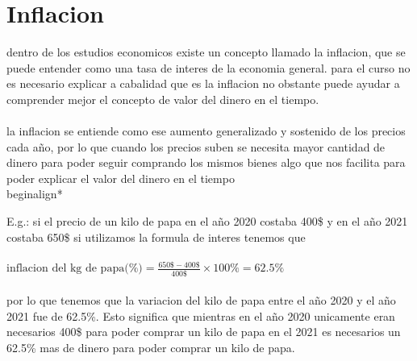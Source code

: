 \documentclass{article}
\begin{document}
\section{Inflacion}
\begin{flushleft}

dentro de los estudios economicos existe un concepto llamado la inflacion, que se puede entender 
como una tasa de interes de la economia general. para el curso no es necesario explicar a cabalidad que es la inflacion 
no obstante puede ayudar a comprender mejor el concepto de valor del dinero en el tiempo.\\~\\

la inflacion se entiende como ese aumento generalizado y sostenido de los precios cada año, por lo que cuando los precios suben se necesita mayor cantidad de dinero para poder seguir comprando los mismos bienes algo que nos facilita para poder explicar el valor del dinero en el tiempo\\begin{align*}

E.g.: si el precio de un kilo de papa en el año 2020 costaba 400\$ y en el año 2021 costaba 650\$ si utilizamos la formula de interes tenemos que
\\~\\
$\text{inflacion del kg de papa(\%)}=\frac{650\$-400\$}{400\$}\times 100\%=62.5\%$\\
~\\
por lo que tenemos que la variacion del kilo de papa entre el año 2020 y el año 2021 fue de 62.5\%. Esto significa que mientras en el año 2020 unicamente eran necesarios 400\$ para poder comprar un kilo de papa en el 2021 es necesarios un 62.5\% mas de dinero para poder comprar un kilo de papa.\\~\\

\end{flushleft}
\end{document}
